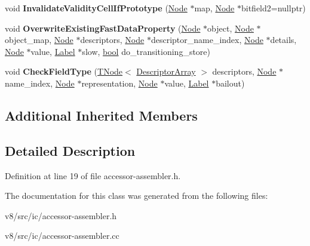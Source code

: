 \begin{DoxyCompactItemize}
\item 
\mbox{\label{classv8_1_1internal_1_1AccessorAssembler_a5d7fc228f04a83d2c5446f49ee6003c7}} 
void {\bfseries Invalidate\+Validity\+Cell\+If\+Prototype} (\mbox{\hyperlink{classv8_1_1internal_1_1compiler_1_1Node}{Node}} $\ast$map, \mbox{\hyperlink{classv8_1_1internal_1_1compiler_1_1Node}{Node}} $\ast$bitfield2=nullptr)
\item 
\mbox{\label{classv8_1_1internal_1_1AccessorAssembler_a0e78b9a81ba4a3b986f11dbcb2dde5b5}} 
void {\bfseries Overwrite\+Existing\+Fast\+Data\+Property} (\mbox{\hyperlink{classv8_1_1internal_1_1compiler_1_1Node}{Node}} $\ast$object, \mbox{\hyperlink{classv8_1_1internal_1_1compiler_1_1Node}{Node}} $\ast$object\+\_\+map, \mbox{\hyperlink{classv8_1_1internal_1_1compiler_1_1Node}{Node}} $\ast$descriptors, \mbox{\hyperlink{classv8_1_1internal_1_1compiler_1_1Node}{Node}} $\ast$descriptor\+\_\+name\+\_\+index, \mbox{\hyperlink{classv8_1_1internal_1_1compiler_1_1Node}{Node}} $\ast$details, \mbox{\hyperlink{classv8_1_1internal_1_1compiler_1_1Node}{Node}} $\ast$value, \mbox{\hyperlink{classv8_1_1internal_1_1compiler_1_1CodeAssemblerLabel}{Label}} $\ast$slow, \mbox{\hyperlink{classbool}{bool}} do\+\_\+transitioning\+\_\+store)
\item 
\mbox{\label{classv8_1_1internal_1_1AccessorAssembler_a6be694fde5be8530afc07da11dbcc742}} 
void {\bfseries Check\+Field\+Type} (\mbox{\hyperlink{classv8_1_1internal_1_1compiler_1_1TNode}{T\+Node}}$<$ \mbox{\hyperlink{classv8_1_1internal_1_1DescriptorArray}{Descriptor\+Array}} $>$ descriptors, \mbox{\hyperlink{classv8_1_1internal_1_1compiler_1_1Node}{Node}} $\ast$name\+\_\+index, \mbox{\hyperlink{classv8_1_1internal_1_1compiler_1_1Node}{Node}} $\ast$representation, \mbox{\hyperlink{classv8_1_1internal_1_1compiler_1_1Node}{Node}} $\ast$value, \mbox{\hyperlink{classv8_1_1internal_1_1compiler_1_1CodeAssemblerLabel}{Label}} $\ast$bailout)
\end{DoxyCompactItemize}
\subsection*{Additional Inherited Members}


\subsection{Detailed Description}


Definition at line 19 of file accessor-\/assembler.\+h.



The documentation for this class was generated from the following files\+:\begin{DoxyCompactItemize}
\item 
v8/src/ic/accessor-\/assembler.\+h\item 
v8/src/ic/accessor-\/assembler.\+cc\end{DoxyCompactItemize}
